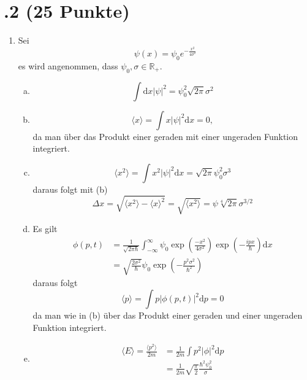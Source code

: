 \section*{\nr.2 \tittwo (25 Punkte)}
\begin{enumerate}
\item Sei 
\begin{equation}
  \psi(x) = \psi_0 e^{-\frac{x^2}{4\sigma^2}}
\end{equation}
es wird angenommen, dass $\psi_0,\sigma\in\mathbb{R}_+$.
\begin{enumerate}[(a)]
\item 
\begin{equation}
  \int \mathrm{d}x |\psi|^2=\psi_0^2\sqrt{2\pi}\sigma^2
\end{equation}
\item 
\begin{equation}
  \langle x\rangle=\int  x |\psi|^2 \mathrm{d}x = 0,
\end{equation}
da man über das Produkt einer geraden mit einer ungeraden Funktion integriert.
\item 
\begin{equation}
  \langle x^2\rangle=\int x^2|\psi|^2\mathrm{d}x = \sqrt{2 \pi}\psi_0^2 \sigma^3
\end{equation}
daraus folgt mit (b)
\begin{equation}
  \Delta x = \sqrt{\langle x^2\rangle-\langle x\rangle^2}=\sqrt{\langle x^2\rangle}=\psi \sqrt[4]{2 \pi} \sigma^{3/2}
\end{equation}
\item Es gilt 
\begin{align}
  \phi(p,t)&=\frac{1}{\sqrt{2 \pi \hbar}}\int_{-\infty}^{\infty}\psi_0 \exp\left(\frac{-x^2}{4\sigma^2}\right)\exp\left(-\frac{ipx}{\hbar}\right)\mathrm{d}x\\
  &=\sqrt{\frac{2 \sigma^2}{\hbar}}\psi_0\exp\left(-\frac{p^2\sigma^2}{\hbar^2}\right)
\end{align}
daraus folgt
\begin{equation}
  \langle p \rangle= \int p |\phi(p,t)|^2 \mathrm{d}p = 0
\end{equation}
da man wie in (b) über das Produkt einer geraden und einer ungeraden Funktion integriert.
\item 
\begin{align}
  \langle E \rangle =  \frac{\langle p^2 \rangle}{2m} &=\frac{1}{2m} \int p^2 |\phi|^2 \mathrm{d}p \\
  &= \frac{1}{2m} \sqrt{\frac{\pi}{2}}\frac{\hbar^2 \psi_0^2}{\sigma}

\end{align}
\end{enumerate}
\end{enumerate}
